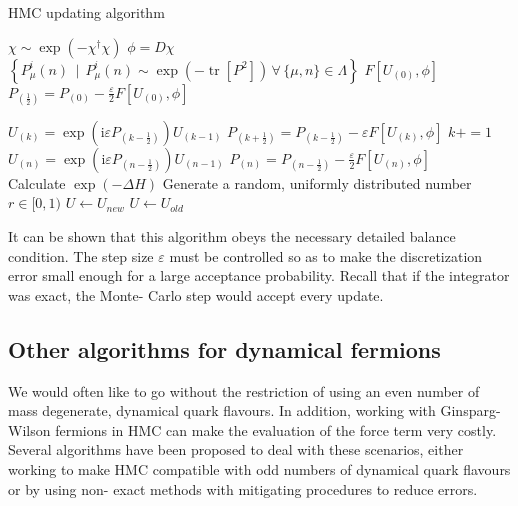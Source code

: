 \documentclass[a4paper,10pt]{book}
\begin{document}
\begin{algorithm}
\caption{HMC updating algorithm}\label{alg:HMCalg}
\begin{algorithmic}

\Ensure 
\State $\chi \sim \exp\left(- \chi^{\dagger} \chi  \right)$
\State $\phi = D\chi$
\State $\left\{P_{\mu}^{i}(n)\, \mid \, P_{\mu}^{i}(n)\sim \exp \left(-\operatorname{tr}\left[P^{2}\right]\right)\,\forall\,\{\mu,n\}\in \Lambda \right\}$
\State $F\left[ U_{(0)},\phi \right]$
\State $P_{\left(\frac{1}{2}\right)}=P_{(0)}-\frac{\varepsilon}{2}F\left[ U_{(0)},\phi \right]$

\State $U_{(k)}=\exp \left(\mathrm{i} \varepsilon P_{\left(k-\frac{1}{2}\right)}\right) U_{(k-1)}$
\State $P_{\left(k+\frac{1}{2}\right)}=P_{\left(k-\frac{1}{2}\right)}-\varepsilon F\left[ U_{(k)},\phi \right]$
\State $ k+=1$
\EndWhile
\State $U_{(n)}=\exp \left(\mathrm{i} \varepsilon P_{\left(n-\frac{1}{2}\right)}\right) U_{(n-1)}$
\State $P_{\left(n\right)}=P_{\left(n-\frac{1}{2}\right)}-\frac{\varepsilon}{2} F\left[ U_{(n)},\phi \right]$\\
\State Calculate $\exp (-\Delta H)$
\State Generate a random, uniformly distributed number $r \in [0,1) $
    \State $U \gets U_{new}$
\Else
    \State $U \gets U_{old}$
\EndIf

\end{algorithmic}
\end{algorithm}
It can be shown \cite{DUANE1987216} that this algorithm obeys the necessary detailed balance condition. The step size $\varepsilon$ must be controlled so as to make the discretization error small enough for a large acceptance probability. Recall that if the integrator was exact, the Monte- Carlo step would accept every update. 
\subsection{Other algorithms for dynamical fermions}
We would often like to go without the restriction of using an even number of mass degenerate, dynamical quark flavours. In addition, working with Ginsparg- Wilson fermions in HMC can make the evaluation of the force term very costly. Several algorithms have been proposed to deal with these scenarios, either working to make HMC compatible with odd numbers of dynamical quark flavours or by using non- exact methods with mitigating procedures to reduce errors.
\end{document}
